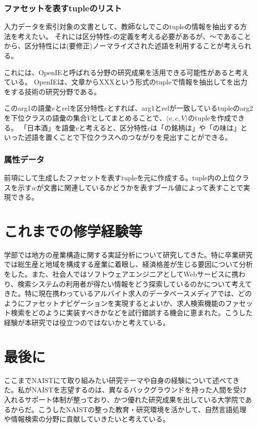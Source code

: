 \documentclass[a4j,10pt, twocolumn]{jarticle} \usepackage[dvipdfmx]{graphicx} \usepackage{amssymb} \usepackage{amsmath}
\begin{document}
\subsubsection{ファセットを表すtupleのリスト}
入力データを索引対象の文書として、教師なしでこのtupleの情報を抽出する方法を考えたい。
それには区分特性$c$の定義を考える必要があるが、〜であることから、区分特性には(要修正)ノーマライズされた述語を利用することが考えられる。

これには、OpenIEと呼ばれる分野の研究成果を活用できる可能性があると考えている。
OpenIEは、文章からXXXという形式のtupleで情報を抽出してを出力をする技術の研究分野である。

このarg1の語彙$v$とrelを区分特性$c$とすれば、arg1とrelが一致しているtupleのarg2を下位クラスの語彙の集合$V$としてまとめることで、$\langle v, c, V\rangle$のtupleを作成できる。
「日本酒」を語彙$v$と考えると、区分特性$c$は「の銘柄は」や「の味は」といった述語を置くことで下位クラスへのつながりを見出すことができる。

\subsubsection{属性データ}
 前項にして生成したファセットを表すtupleを元に作成する。tuple内の上位クラスを示す$w$が文書に関連しているかどうかを表すブール値によって表すことで実現できる。

\section{これまでの修学経験等}
 学部では地方の産業構造に関する実証分析について研究してきた。特に卒業研究では総生産と地域を構成する産業に着眼し、経済格差が生じる要因について分析をした。また、社会人ではソフトウェアエンジニアとしてWebサービスに携わり、検索システムの利用者が得たい情報をどう探索しているのかについて考えてきた。特に現在携わっているアルバイト求人のデータベースメディアでは、どのようにファセットナビゲーションを実現するとよいか、求人検索機能のファセット検索をどのように実装すべきかなどを試行錯誤する機会に恵まれた。こうした経験が本研究では役立つのではないかと考えている。

\section{最後に}
ここまでNAISTにて取り組みたい研究テーマや自身の経験について述べてきた。私がNAISTを志望するのは、異なるバックグラウンドを持った人間を受け入れるサポート体制が整っており、かつ優れた研究成果を出している大学院であるからだ。こうしたNAISTの整った教育・研究環境を活かして、自然言語処理や情報検索の分野に貢献していきたいと考えている。
\end{document}
